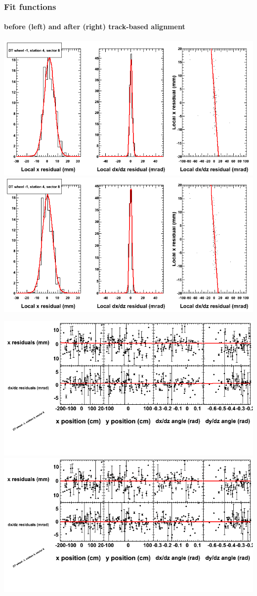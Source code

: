 \documentclass[compress]{beamer}
\begin{document}
\begin{frame}
\frametitle{Fit functions}
\framesubtitle{before (left) and after (right) track-based alignment}
\includegraphics[width=0.5\linewidth]{fitfunctions_re01/MBwhBst4sec08_bellcurves.png} \includegraphics[width=0.5\linewidth]{fitfunctions_re05/MBwhBst4sec08_bellcurves.png}

\includegraphics[width=0.5\linewidth]{fitfunctions_re01/MBwhBst4sec08_polynomials.png} \includegraphics[width=0.5\linewidth]{fitfunctions_re05/MBwhBst4sec08_polynomials.png}
\end{frame}
\end{document}
